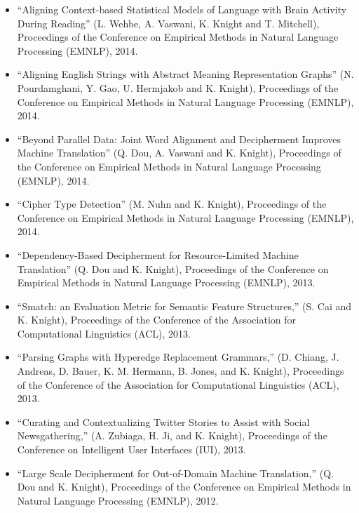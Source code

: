 \begin{itemize}
\item ``Aligning Context-based Statistical Models of Language with Brain Activity During Reading'' (L. Wehbe, A. Vaswani, K. Knight and T. Mitchell),
Proceedings of the Conference on Empirical Methods in 
Natural Language Processing (EMNLP), 2014.

\item ``Aligning English Strings with Abstract Meaning Representation Graphs'' (N. Pourdamghani, Y. Gao, U. Hermjakob and K. Knight), 
Proceedings of the Conference on Empirical Methods in 
Natural Language Processing (EMNLP), 2014.

\item ``Beyond Parallel Data: Joint Word Alignment and Decipherment Improves Machine Translation'' (Q. Dou, A. Vaswani and K. Knight), 
Proceedings of the Conference on Empirical Methods in 
Natural Language Processing (EMNLP), 2014.

\item ``Cipher Type Detection'' (M. Nuhn and K. Knight), 
Proceedings of the Conference on Empirical Methods in 
Natural Language Processing (EMNLP), 2014.

\item ``Dependency-Based Decipherment for Resource-Limited Machine Translation'' (Q. Dou and K. Knight), 
Proceedings of the Conference on Empirical Methods in 
Natural Language Processing (EMNLP), 2013.

\item ``Smatch: an Evaluation Metric for Semantic Feature Structures,'' (S. Cai and K. Knight), 
Proceedings of the Conference of the 
Association for Computational Linguistics (ACL), 2013.

\item ``Parsing Graphs with Hyperedge Replacement Grammars,'' (D. Chiang, J. Andreas, D. Bauer, K. M. Hermann, B. Jones, and K. Knight), 
Proceedings of the Conference of the 
Association for Computational Linguistics (ACL), 2013.

\item ``Curating and Contextualizing Twitter Stories to Assist with Social Newsgathering,'' (A. Zubiaga, H. Ji, and K. Knight), 
Proceedings of the Conference on Intelligent User Interfaces (IUI), 2013. 

\item ``Large Scale Decipherment for Out-of-Domain Machine Translation,'' 
(Q. Dou and K. Knight), 
Proceedings of the Conference on Empirical Methods in 
Natural Language Processing (EMNLP), 2012.


\end{itemize}
